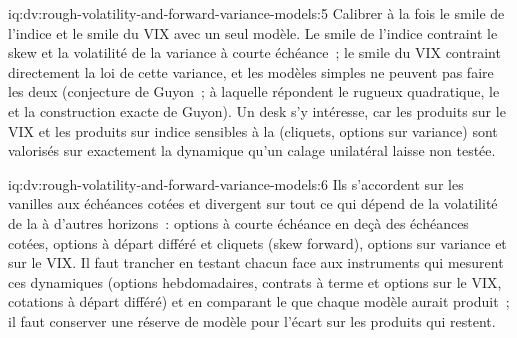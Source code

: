 \begin{solution}{iq:dv:rough-volatility-and-forward-variance-models:5}
Calibrer à la fois le smile de l'indice et le smile du VIX avec un seul modèle. Le smile de l'indice contraint le skew et la volatilité de
la variance à courte échéance~; le smile du VIX contraint directement la loi de cette variance, et les modèles simples ne peuvent pas faire les deux
(conjecture de Guyon~; à laquelle répondent le  rugueux quadratique, le  et la construction exacte
de Guyon). Un desk s'y intéresse, car les produits sur le VIX et les produits sur indice sensibles à la 
(cliquets, options sur variance) sont valorisés sur exactement la dynamique qu'un calage unilatéral laisse non testée.
\end{solution}

\begin{solution}{iq:dv:rough-volatility-and-forward-variance-models:6}
Ils s'accordent sur les vanilles aux échéances cotées et divergent sur tout ce qui dépend de la volatilité de la
 à d'autres horizons~: options à courte échéance en deçà des échéances cotées, options à départ différé et cliquets
(skew forward), options sur variance et sur le VIX. Il faut trancher en testant chacun face aux instruments qui mesurent
ces dynamiques (options hebdomadaires, contrats à terme et options sur le VIX, cotations à départ différé) et en comparant le
 que chaque modèle aurait produit~; il faut conserver une réserve de modèle pour l'écart sur les produits qui restent.
\end{solution}

